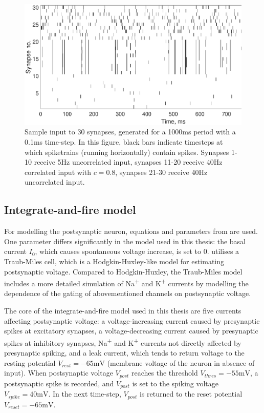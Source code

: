 \documentclass[a4paper,12pt]{report}
\theoremstyle{definition}
\begin{document}
\begin{figure}[h]
    \includegraphics[width=\textwidth]{figures/methods_sample_input.eps}
    \caption{Sample input to 30 synapses, generated for a 1000ms period with a 0.1ms time-step. In this figure, black bars indicate timesteps at which spiketrains (running horizontally) contain spikes. Synapses 1-10 receive 5Hz uncorrelated input, synapses 11-20 receive 40Hz correlated input with $c=0.8$, synapses 21-30 receive 40Hz uncorrelated input.}
    \label{fig:methods_sample_input}
\end{figure}




\subsection{Integrate-and-fire model}

For modelling the postsynaptic neuron, equations and parameters from \cite{ermentrout1998fine} are used. One parameter differs significantly in the model used in this thesis: the basal current $I_0$, which causes spontaneous voltage increase, is set to $0$. \cite{ermentrout1998fine} utilises a Traub-Miles cell, which is a Hodgkin-Huxley-like model for estimating postsynaptic voltage. Compared to Hodgkin-Huxley, the Traub-Miles model includes a more detailed simulation of Na\textsuperscript{+} and K\textsuperscript{+} currents by modelling the dependence of the gating of abovementioned channels on postsynaptic voltage.

The core of the integrate-and-fire model used in this thesis are five currents affecting postsynaptic voltage: a voltage-increasing current caused by presynaptic spikes at excitatory synapses, a voltage-decreasing current caused by presynaptic spikes at inhibitory synapses, Na\textsuperscript{+} and K\textsuperscript{+} currents not directly affected by presynaptic spiking, and a leak current, which tends to return voltage to the resting potential $V_{rest}=-65\mathrm{mV}$ (membrane voltage of the neuron in absence of input). When postsynaptic voltage $V_{post}$ reaches the threshold $V_{thres}=-55\mathrm{mV}$, a postsynaptic spike is recorded, and $V_{post}$ is set to the spiking voltage $V_{spike}=40\mathrm{mV}$. In the next time-step, $V_{post}$ is returned to the reset potential $V_{reset}=-65\mathrm{mV}$.
\end{document}
